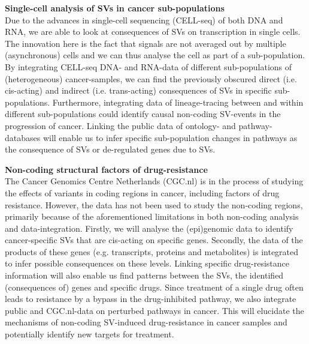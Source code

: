 \documentclass[twoside,fontsize=12pt]{article}
\begin{document}
\noindent
\textbf{Single-cell analysis of SVs in cancer sub-populations} \\
Due to the advances in single-cell sequencing (CELL-seq) of both DNA and RNA, we are able to look at consequences of SVs on transcription in single cells. The innovation here is the fact that signals are not averaged out by multiple (asynchronous) cells and we can thus analyse the cell as part of a sub-population. By integrating CELL-seq DNA- and RNA-data of different sub-populations of (heterogeneous) cancer-samples, we can find the previously obscured direct (i.e. cis-acting) and indirect (i.e. trans-acting) consequences of SVs in specific sub-populations. Furthermore, integrating data of lineage-tracing between and within different sub-populations could identify causal non-coding SV-events in the progression of cancer. Linking the public data of ontology- and pathway-databases will enable us to infer specific sub-population changes in pathways as the consequence of SVs or de-regulated genes due to SVs.
\medskip

\noindent
\textbf{Non-coding structural factors of drug-resistance} \\
The Cancer Genomics Centre Netherlands (CGC.nl) is in the process of studying the effects of variants in coding regions in cancer, including factors of drug resistance. However, the data has not been used to study the non-coding regions, primarily because of the aforementioned limitations in both non-coding analysis and data-integration. Firstly, we will analyse the (epi)genomic data to identify cancer-specific SVs that are cis-acting on specific genes. Secondly, the data of the products of these genes (e.g. transcripts, proteins and metabolites) is integrated to infer possible consequences on these levels. Linking specific drug-resistance information will also enable us find patterns between the SVs, the identified (consequences of) genes and specific drugs. Since treatment of a single drug often leads to resistance by a bypass in the drug-inhibited pathway\cite{Prahallad2012}, we also integrate public and CGC.nl-data on perturbed pathways in cancer. This will elucidate the mechanisms of non-coding SV-induced drug-resistance in cancer samples and potentially identify new targets for treatment.
\end{document}
